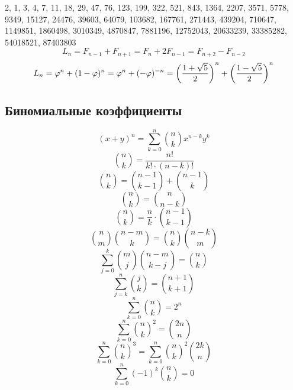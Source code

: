 \documentclass[11.5pt,a4paper,landscape,oneside]{amsart}
\newcommand{\Sequence}[1]{\subsection{#1}}
\begin{document}
\begin{multicols*}{2}
	2, 1, 3, 4, 7, 11, 18, 29, 47, 76, 123, 199, 322, 521, 843, 1364, 2207, 3571, 5778, 9349, 15127, 24476, 39603, 64079, 103682, 167761, 271443, 439204, 710647, 1149851, 1860498, 3010349, 4870847, 7881196, 12752043, 20633239, 33385282, 54018521, 87403803
	\begin{equation}
		L_n = F_{n-1}+F_{n+1}=F_n+2F_{n-1} = F_{n+2}-F_{n-2}
	\end{equation}
	\begin{equation}
		L_n = \varphi^n + (1-\varphi)^{n} = \varphi^n + (- \varphi)^{-n}=\left({ 1+ \sqrt{5} \over 2}\right)^n + \left({ 1- \sqrt{5} \over 2}\right)^n
	\end{equation}
	\Sequence{Биномиальные коэффициенты}
	\begin{equation}
		(x+y)^n=\sum_{k=0}^n\binom{n}{k} x^{n-k}y^k
	\end{equation}
	\begin{equation}
		\binom{n}{k} = \frac{n!}{k!\cdot(n-k)!}
	\end{equation}
	\begin{equation}
		\binom{n}{k} = \binom{n-1}{k-1} + \binom{n-1}{k}
	\end{equation}
	\begin{equation}
		\binom{n}{k} = \binom{n}{n-k}
	\end{equation}
	\begin{equation}
		\binom{n}{k} = \frac{n}{k}\cdot\binom{n-1}{k-1}
	\end{equation}
	\begin{equation}
		\binom{n}{m}\binom{n-m}{k}=\binom{n}{k}\binom{n-k}{m}
	\end{equation}
	\begin{equation}
		\sum_{j=0}^k\binom{m}{j}\binom{n-m}{k-j}=\binom{n}{k}
	\end{equation}
	\begin{equation}
		\sum_{j=k}^n\binom{j}{k}=\binom{n+1}{k+1}
	\end{equation}
	\begin{equation}
		\sum_{k=0}^n \binom{n}{k} = 2^n
	\end{equation}
	\begin{equation}
		\sum_{k=0}^n \binom{n}{k}^2 = \binom{2n}{n}
	\end{equation}
	\begin{equation}
		\sum_{k=0}^n\binom{n}{k}^3=\sum_{k=0}^n\binom{n}{k}^2\binom{2k}n
	\end{equation}
	\begin{equation}
		\sum_{k=0}^n (-1)^k\binom{n}{k} = 0
	\end{equation}

\end{multicols*}
\end{document}
